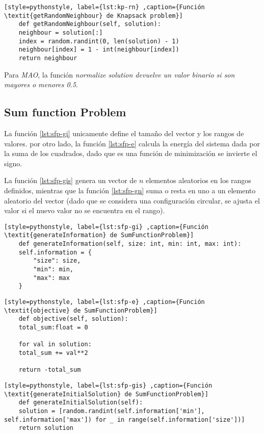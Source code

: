 \begin{lstlisting}[style=pythonstyle, label={lst:kp-rn} ,caption={Función \textit{getRandomNeighbour} de Knapsack problem}]
	def getRandomNeighbour(self, solution):
	neighbour = solution[:]
	index = random.randint(0, len(solution) - 1)
	neighbour[index] = 1 - int(neighbour[index])
	return neighbour  
\end{lstlisting}

Para \textit{MAO}, la función \textit{normalize solution devuelve un valor binario si son mayores o menores 0.5}.

\subsection{Sum function Problem}

La función \ref{lst:sfp-gi} unicamente define el tamaño del vector y los rangos de valores. por otro lado, la función \ref{lst:sfp-e} calcula la energía del sistema dada por la suma de los cuadrados, dado que es una función de minimización se invierte el signo.

La función \ref{lst:sfp-gis} genera un vector de $n$ elementos aleatorios en los rangos definidos, mientras que la función \ref{lst:sfp-gn} suma  o resta en uno a un elemento aleatorio del vector (dado que se considera una configuración circular, se ajusta el valor si el nuevo valor no se encuentra en el rango).

\begin{lstlisting}[style=pythonstyle, label={lst:sfp-gi} ,caption={Función \textit{generateInformation} de SumFunctionProblem}]
	def generateInformation(self, size: int, min: int, max: int):
	self.information = {
		"size": size,
		"min": min,
		"max": max
	}
\end{lstlisting}

\begin{lstlisting}[style=pythonstyle, label={lst:sfp-e} ,caption={Función \textit{objective} de SumFunctionProblem}]
	def objective(self, solution):
	total_sum:float = 0
	
	for val in solution:
	total_sum += val**2
	
	return -total_sum
\end{lstlisting}

\begin{lstlisting}[style=pythonstyle, label={lst:sfp-gis} ,caption={Función \textit{generateInitialSolution} de SumFunctionProblem}]
	def generateInitialSolution(self):
	solution = [random.randint(self.information['min'], self.information['max']) for _ in range(self.information['size'])]
	return solution
\end{lstlisting}

